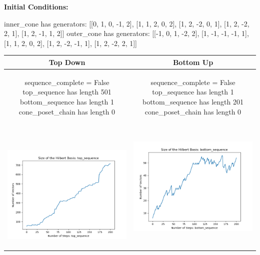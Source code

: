 \documentclass[10pt]{article}
\begin{document}
\textbf{Initial Conditions:}
\begin{SAGE}
inner_cone has generators: 
[[0, 1, 0, -1, 2], [1, 1, 2, 0, 2], [1, 2, -2, 0, 1], [1, 2, -2, 2, 1], [1, 2, -1, 1, 2]]
outer_cone has generators: 
[[-1, 0, 1, -2, 2], [1, -1, -1, -1, 1], [1, 1, 2, 0, 2], [1, 2, -2, -1, 1], [1, 2, -2, 2, 1]]

\end{SAGE}
\begin{tabular}{c|c}
\textbf{Top Down} & \textbf{Bottom Up} \\ \hline  
\begin{SAGE}
	sequence_complete = False
	top_sequence has length 501
	bottom_sequence has length 1
	cone_poset_chain has length 0
\end{SAGE} 
&
\begin{SAGE}
	sequence_complete = False
	top_sequence has length 1
	bottom_sequence has length 201
	cone_poset_chain has length 0
\end{SAGE} 
\\ \hline
\
\begin{minipage}{.45\textwidth}
\includegraphics[width=\textwidth]{"DATA/5d/5 generators 2 bound I/top_sequence SIZE"}
\end{minipage} &
\begin{minipage}{.45\textwidth}
\includegraphics[width=\textwidth]{"DATA/5d/5 generators 2 bound I bottomup/bottom_sequence SIZE"}

\end{minipage}
\end{tabular}
\end{document}
